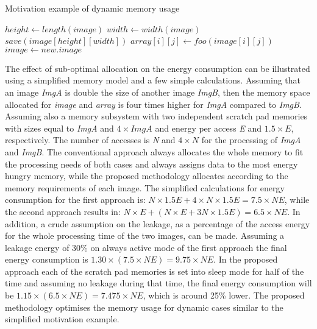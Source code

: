 \documentclass{acm_proc_article-sp}
\begin{document}
\begin{algorithm}[]
\caption{Motivation example of dynamic memory usage}
 \label{fig:motivation}
 \begin{algorithmic}[1]
		\STATE $height \gets length(image)$
		\STATE $width \gets width(image)$
		\STATE $save(image[height][width])$
					\STATE $array[i][j] \gets foo(image[i][j])$
				\ENDFOR
			\ENDFOR
		\STATE $image \gets new.image$	
	\ENDWHILE
 \end{algorithmic}
\end{algorithm}

The effect of sub-optimal allocation on the energy consumption can be illustrated using a simplified memory model and a few simple calculations. Assuming that an image \textit{ImgA} is double the size of another image \textit{ImgB}, then the memory space allocated for \textit{image} and \textit{array} is four times higher for \textit{ImgA} compared to \textit{ImgB}. Assuming also a memory subsystem with two independent scratch pad memories with sizes equal to \textit{ImgA} and $4 \times \textit{ImgA}$ and energy per access \textit{E} and $1.5 \times E$, respectively. The number of accesses is \textit{N} and $ 4 \times N$ for the processing of \textit{ImgA} and \textit{ImgB}. The conventional approach always allocates the whole memory to fit the processing needs of both cases and always assigns data to the most energy hungry memory, while the proposed methodology allocates according to the memory requirements of each image. The simplified calculations for energy consumption for the first approach is: \begin{math}N \times 1.5E + 4 \times N \times 1.5E = 7.5 \times NE\end{math}, while the second approach results in: \begin{math}N \times E + ( N \times E + 3N \times 1.5E ) = 6.5 \times NE \end{math}. In addition, a crude assumption on the leakage, as a percentage of the access energy for the whole processing time of the two images, can be made. Assuming a leakage energy of 30\% on always active mode of the first approach the final energy consumption is $ 1.30 \times ( 7.5 \times NE )  = 9.75 \times NE$. In the proposed approach each of the scratch pad memories is set into sleep mode for half of the time and assuming no leakage during that time, the final energy consumption will be $ 1.15 \times ( 6.5 \times NE )  = 7.475 \times NE$, which is around 25\% lower. The proposed methodology optimises the memory usage for dynamic cases similar to the simplified motivation example.
\end{document}
